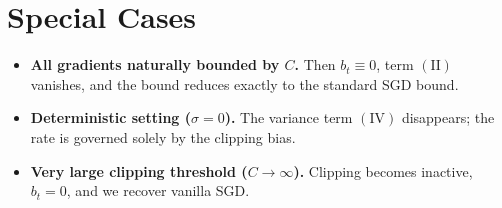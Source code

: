 \documentclass{article}
\begin{document}
\section*{Special Cases}
\begin{itemize}
\item \textbf{All gradients naturally bounded by $C$.}
    Then $b_t\equiv0$, term \((\mathrm{II})\) vanishes, and the bound reduces
    exactly to the standard SGD bound.
\item \textbf{Deterministic setting ($\sigma=0$).}
    The variance term $(\mathrm{IV})$ disappears; the rate is governed solely
    by the clipping bias.
\item \textbf{Very large clipping threshold ($C\to\infty$).}
    Clipping becomes inactive, $b_t=0$, and we recover vanilla SGD.
\end{itemize}
\end{document}
